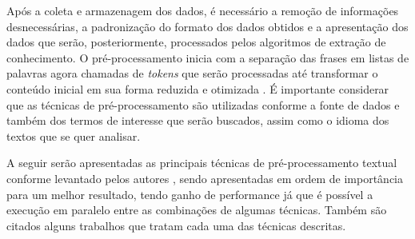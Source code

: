 Após a coleta e armazenagem dos dados, é necessário a remoção de informações desnecessárias, a padronização do formato dos dados obtidos e a apresentação dos dados que serão, posteriormente, processados pelos algoritmos de extração de conhecimento. O pré-processamento inicia com a separação das frases em listas de palavras agora chamadas de \textit{tokens} que serão processadas até transformar o conteúdo inicial em sua forma reduzida e otimizada \cite{SYMEONIDIS2018298}. É importante considerar que as técnicas de pré-processamento são utilizadas conforme a fonte de dados e também dos termos de interesse que serão buscados, assim como o idioma dos textos que se quer analisar. 

A seguir serão apresentadas as principais técnicas de pré-processamento textual conforme levantado pelos autores , sendo apresentadas em ordem de importância para um melhor resultado, tendo ganho de performance já que é possível a execução em paralelo entre as combinações de algumas técnicas. Também são citados alguns trabalhos que tratam cada uma das técnicas descritas.

